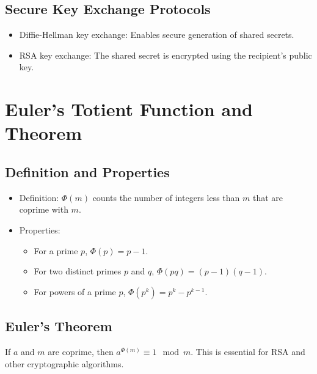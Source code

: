 \documentclass{article}
\begin{document}
\subsection{Secure Key Exchange Protocols}
\begin{itemize}
    \item Diffie-Hellman key exchange: Enables secure generation of shared secrets.
    \item RSA key exchange: The shared secret is encrypted using the recipient's public key.
\end{itemize}

\section{Euler's Totient Function and Theorem}

\subsection{Definition and Properties}
\begin{itemize}
    \item Definition: $\Phi(m)$ counts the number of integers less than $m$ that are coprime with $m$.
    \item Properties:
    \begin{itemize}
        \item For a prime $p$, $\Phi(p) = p - 1$.
        \item For two distinct primes $p$ and $q$, $\Phi(pq) = (p - 1)(q - 1)$.
        \item For powers of a prime $p$, $\Phi(p^k) = p^k - p^{k-1}$.
    \end{itemize}
\end{itemize}

\subsection{Euler's Theorem}
If $a$ and $m$ are coprime, then $a^{\Phi(m)} \equiv 1 \mod m$. This is essential for RSA and other cryptographic algorithms.
\end{document}
